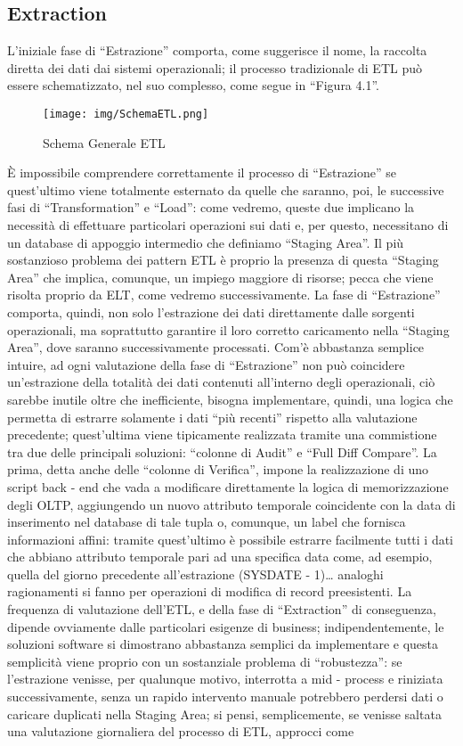 \documentclass[a4paper,12pt]{report}
\begin{document}
\subsection{Extraction}
L’iniziale fase di “Estrazione” comporta, come suggerisce il nome, la raccolta diretta dei dati dai sistemi operazionali; il processo tradizionale di ETL può essere schematizzato, nel suo complesso, come segue in “Figura 4.1”.

\begin{figure}[h]
    \centering
    \texttt{[image: img/SchemaETL.png]}
    \caption{Schema Generale ETL}
\end{figure}

\noindent
È impossibile comprendere correttamente il processo di “Estrazione” se quest’ultimo viene totalmente esternato da quelle che saranno, poi, le successive fasi di “Transformation” e “Load”: come vedremo, queste due implicano la necessità di effettuare particolari operazioni sui dati e, per questo, necessitano di un database di appoggio intermedio che definiamo “Staging Area”. Il più sostanzioso problema dei pattern ETL è proprio la presenza di questa “Staging Area” che implica, comunque, un impiego maggiore di risorse; pecca che viene risolta proprio da ELT, come vedremo successivamente. La fase di “Estrazione” comporta, quindi, non solo l’estrazione dei dati direttamente dalle sorgenti operazionali, ma soprattutto garantire il loro corretto caricamento nella “Staging Area”, dove saranno successivamente processati. Com’è abbastanza semplice intuire, ad ogni valutazione della fase di “Estrazione” non può coincidere un’estrazione della totalità dei dati contenuti all’interno degli operazionali, ciò sarebbe inutile oltre che inefficiente, bisogna implementare, quindi, una logica che permetta di estrarre solamente i dati “più recenti” rispetto alla valutazione precedente; quest’ultima viene tipicamente realizzata tramite una commistione tra due delle principali soluzioni: “colonne di Audit” e “Full Diff Compare”. La prima, detta anche delle “colonne di Verifica”, impone la realizzazione di uno script back - end che vada a modificare direttamente la logica di memorizzazione degli OLTP, aggiungendo un nuovo attributo temporale coincidente con la data di inserimento nel database di tale tupla o, comunque, un label che fornisca informazioni affini: tramite quest’ultimo è possibile estrarre facilmente tutti i dati che abbiano attributo temporale pari ad una specifica data come, ad esempio, quella del giorno precedente all’estrazione (SYSDATE - 1)… analoghi ragionamenti si fanno per operazioni di modifica di record preesistenti. La frequenza di valutazione dell’ETL, e della fase di “Extraction” di conseguenza, dipende ovviamente dalle particolari esigenze di business; indipendentemente, le soluzioni software si dimostrano abbastanza semplici da implementare e questa semplicità viene proprio con un sostanziale problema di “robustezza”: se l’estrazione venisse, per qualunque motivo, interrotta a mid - process e riniziata successivamente, senza un rapido intervento manuale potrebbero perdersi dati o caricare duplicati nella Staging Area; si pensi, semplicemente, se venisse saltata una valutazione giornaliera del processo di ETL, approcci come 
\end{document}
